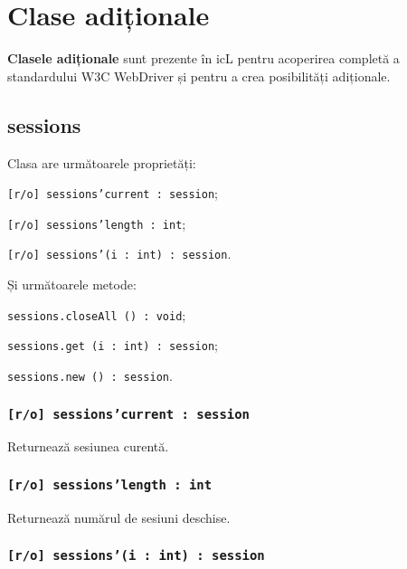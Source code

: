 

\section{Clase adiționale}

{\bf Clasele adiționale} sunt prezente în icL pentru acoperirea completă a standardului W3C WebDriver și pentru a crea posibilități adiționale.

\subsection{sessions}

Clasa \sessions{} are următoarele proprietăți:
\begin{icItems}
	\item \texttt{[r/o] sessions'current : session};
	\item \texttt{[r/o] sessions'length : int};
	\item \texttt{[r/o] sessions'(i : int) : session}.
\end{icItems}

Și următoarele metode:
\begin{icItems}
	\item \texttt{sessions.closeAll () : void};
	\item \texttt{sessions.get (i : int) : session};
	\item \texttt{sessions.new () : session}.
\end{icItems}

\subsubsection{\texttt{[r/o] sessions'current : session}}

Returnează sesiunea curentă.

\subsubsection{\texttt{[r/o] sessions'length : int}}

Returnează numărul de sesiuni deschise.

\subsubsection{\texttt{[r/o] sessions'(i : int) : session}}

